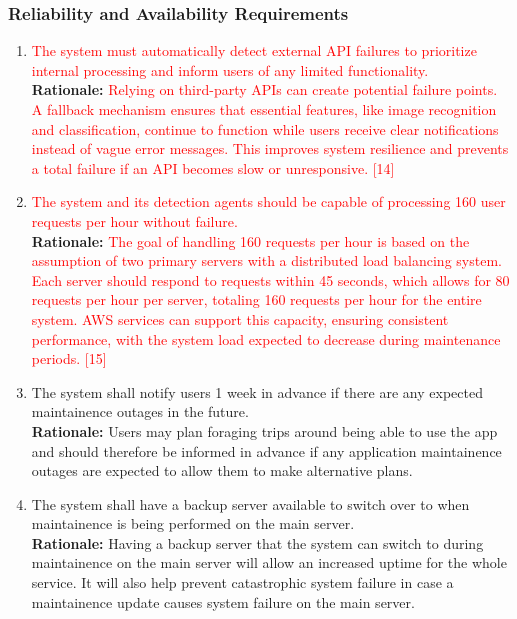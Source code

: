 \documentclass{article}
\begin{document}
\subsubsection{Reliability and Availability Requirements}
\label{ssub:reliability_and_availability_requirements}
\begin{enumerate}[{PR-RA}1. ]
	\item \textcolor{red}{The system must automatically detect external API failures to prioritize internal processing and inform users of any limited functionality.}\\
	\textbf{Rationale:} \textcolor{red}{Relying on third-party APIs can create potential failure points. A fallback mechanism ensures that essential features, like image recognition and classification, continue to function while users receive clear notifications instead of vague error messages. This improves system resilience and prevents a total failure if an API becomes slow or unresponsive. [14]}\\
	\item \textcolor{red}{The system and its detection agents should be capable of processing 160 user requests per hour without failure.}\\
	\textbf{Rationale:} \textcolor{red}{The goal of handling 160 requests per hour is based on the assumption of two primary servers with a distributed load balancing system. Each server should respond to requests within 45 seconds, which allows for 80 requests per hour per server, totaling 160 requests per hour for the entire system. AWS services can support this capacity, ensuring consistent performance, with the system load expected to decrease during maintenance periods. [15]}
	\item The system shall notify users 1 week in advance if there are any expected maintainence outages in the future.\\
	\textbf{Rationale:} Users may plan foraging trips around being able to use the app and should therefore be informed in advance if any application maintainence outages are expected to allow them to make alternative plans. 
	\item The system shall have a backup server available to switch over to when maintainence is being performed on the main server.\\
	\textbf{Rationale:} Having a backup server that the system can switch to during maintainence on the main server will allow an increased uptime for the whole service. It will also help prevent catastrophic system failure 
	in case a maintainence update causes system failure on the main server.
\end{enumerate}
\end{document}
